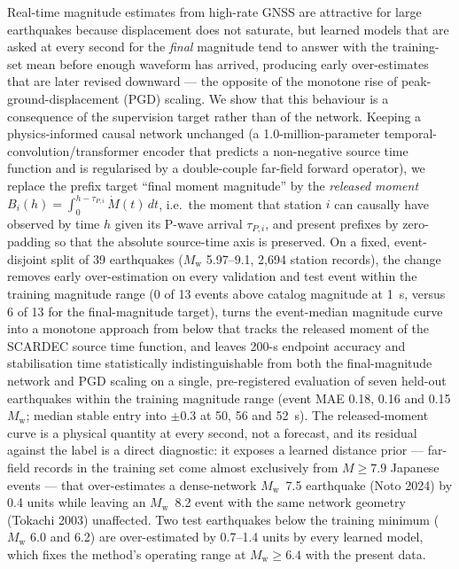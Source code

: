 \documentclass[12pt,letterpaper]{article}
\newcommand{\Mw}{M_{\mathrm{w}}}
\newcommand{\Mdot}{\dot{M}}
\begin{document}
Real-time magnitude estimates from high-rate GNSS are attractive for large earthquakes because displacement does not saturate, but learned models that are asked at every second for the \emph{final} magnitude tend to answer with the training-set mean before enough waveform has arrived, producing early over-estimates that are later revised downward --- the opposite of the monotone rise of peak-ground-displacement (PGD) scaling. We show that this behaviour is a consequence of the supervision target rather than of the network. Keeping a physics-informed causal network unchanged (a 1.0-million-parameter temporal-convolution/transformer encoder that predicts a non-negative source time function and is regularised by a double-couple far-field forward operator), we replace the prefix target ``final moment magnitude'' by the \emph{released moment} $B_i(h)=\int_0^{h-\tau_{P,i}}\Mdot(t)\,dt$, i.e.\ the moment that station $i$ can causally have observed by time $h$ given its P-wave arrival $\tau_{P,i}$, and present prefixes by zero-padding so that the absolute source-time axis is preserved. On a fixed, event-disjoint split of 39 earthquakes ($\Mw$ 5.97--9.1, 2,694 station records), the change removes early over-estimation on every validation and test event within the training magnitude range (0 of 13 events above catalog magnitude at 1~s, versus 6 of 13 for the final-magnitude target), turns the event-median magnitude curve into a monotone approach from below that tracks the released moment of the SCARDEC source time function, and leaves 200-s endpoint accuracy and stabilisation time statistically indistinguishable from both the final-magnitude network and \citet{Crowell2013} PGD scaling on a single, pre-registered evaluation of seven held-out earthquakes within the training magnitude range (event MAE 0.18, 0.16 and 0.15 $\Mw$; median stable entry into $\pm0.3$ at 50, 56 and 52~s). The released-moment curve is a physical quantity at every second, not a forecast, and its residual against the label is a direct diagnostic: it exposes a learned distance prior --- far-field records in the training set come almost exclusively from $M\geq7.9$ Japanese events --- that over-estimates a dense-network $\Mw$~7.5 earthquake (Noto 2024) by 0.4 units while leaving an $\Mw$~8.2 event with the same network geometry (Tokachi 2003) unaffected. Two test earthquakes below the training minimum ($\Mw$ 6.0 and 6.2) are over-estimated by 0.7--1.4 units by every learned model, which fixes the method's operating range at $\Mw\geq6.4$ with the present data.
\end{document}
